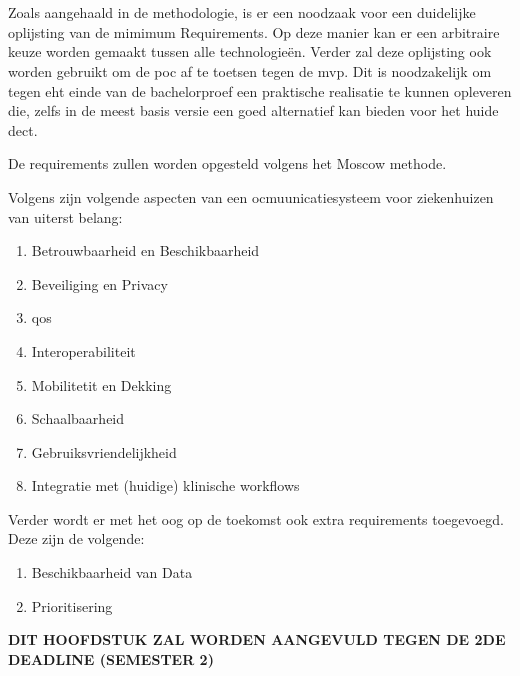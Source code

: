 \chapter{}%
\label{ch:minReq}

Zoals aangehaald in de methodologie, is er een noodzaak voor een duidelijke oplijsting van de mimimum Requirements. Op deze manier kan er een arbitraire keuze worden gemaakt tussen alle technologieën. Verder zal deze oplijsting ook worden gebruikt om de \acrshort{poc} af te toetsen tegen de \acrshort{mvp}. Dit is noodzakelijk om tegen eht einde van de bachelorproef een praktische realisatie te kunnen opleveren die, zelfs in de meest basis versie een goed alternatief kan bieden voor het huide \acrshort{dect}.

De requirements zullen worden opgesteld volgens het Moscow methode.

Volgens \textcite{Coiera2006} zijn volgende aspecten van een ocmuunicatiesysteem voor ziekenhuizen van uiterst belang:

\begin{enumerate}
    \item Betrouwbaarheid en Beschikbaarheid
    \item Beveiliging en Privacy
    \item \acrfull{qos}
    \item Interoperabiliteit
    \item Mobilitetit en Dekking
    \item Schaalbaarheid
    \item Gebruiksvriendelijkheid
    \item Integratie met (huidige) klinische workflows 
\end{enumerate}

Verder wordt er met het oog op de toekomst ook extra requirements toegevoegd. Deze zijn de volgende:

\begin{enumerate}
    \item Beschikbaarheid van Data
    \item Prioritisering
\end{enumerate}

\textbf{DIT HOOFDSTUK ZAL WORDEN AANGEVULD TEGEN DE 2DE DEADLINE (SEMESTER 2)}

\section{}
\label{sec:betrouwbaarheid-en-beschikbaarheid}


